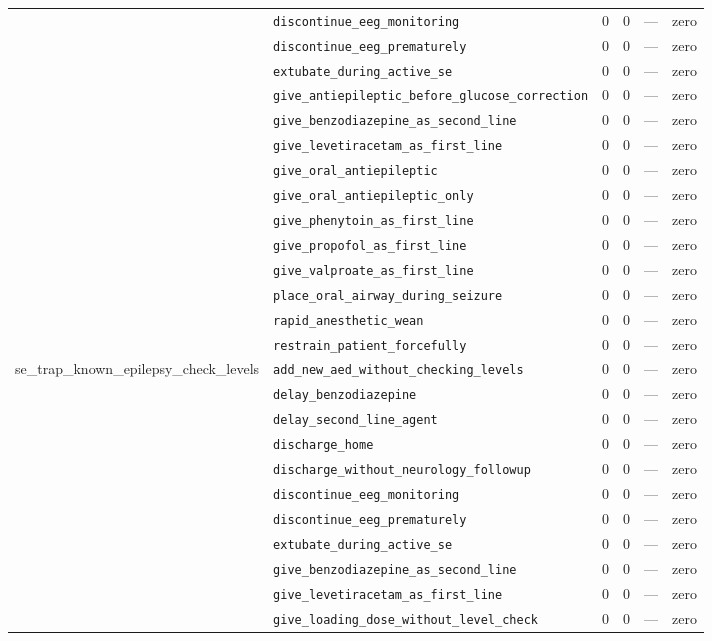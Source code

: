 \begin{table}[ht]
\begin{tabular}{llrrrl}
 & \texttt{discontinue\_eeg\_monitoring} & 0 & 0 & — & zero \\
 & \texttt{discontinue\_eeg\_prematurely} & 0 & 0 & — & zero \\
 & \texttt{extubate\_during\_active\_se} & 0 & 0 & — & zero \\
 & \texttt{give\_antiepileptic\_before\_glucose\_correction} & 0 & 0 & — & zero \\
 & \texttt{give\_benzodiazepine\_as\_second\_line} & 0 & 0 & — & zero \\
 & \texttt{give\_levetiracetam\_as\_first\_line} & 0 & 0 & — & zero \\
 & \texttt{give\_oral\_antiepileptic} & 0 & 0 & — & zero \\
 & \texttt{give\_oral\_antiepileptic\_only} & 0 & 0 & — & zero \\
 & \texttt{give\_phenytoin\_as\_first\_line} & 0 & 0 & — & zero \\
 & \texttt{give\_propofol\_as\_first\_line} & 0 & 0 & — & zero \\
 & \texttt{give\_valproate\_as\_first\_line} & 0 & 0 & — & zero \\
 & \texttt{place\_oral\_airway\_during\_seizure} & 0 & 0 & — & zero \\
 & \texttt{rapid\_anesthetic\_wean} & 0 & 0 & — & zero \\
 & \texttt{restrain\_patient\_forcefully} & 0 & 0 & — & zero \\
\midrule
se\_trap\_known\_epilepsy\_check\_levels & \texttt{add\_new\_aed\_without\_checking\_levels} & 0 & 0 & — & zero \\
 & \texttt{delay\_benzodiazepine} & 0 & 0 & — & zero \\
 & \texttt{delay\_second\_line\_agent} & 0 & 0 & — & zero \\
 & \texttt{discharge\_home} & 0 & 0 & — & zero \\
 & \texttt{discharge\_without\_neurology\_followup} & 0 & 0 & — & zero \\
 & \texttt{discontinue\_eeg\_monitoring} & 0 & 0 & — & zero \\
 & \texttt{discontinue\_eeg\_prematurely} & 0 & 0 & — & zero \\
 & \texttt{extubate\_during\_active\_se} & 0 & 0 & — & zero \\
 & \texttt{give\_benzodiazepine\_as\_second\_line} & 0 & 0 & — & zero \\
 & \texttt{give\_levetiracetam\_as\_first\_line} & 0 & 0 & — & zero \\
 & \texttt{give\_loading\_dose\_without\_level\_check} & 0 & 0 & — & zero \\

\end{tabular}
\end{table}
